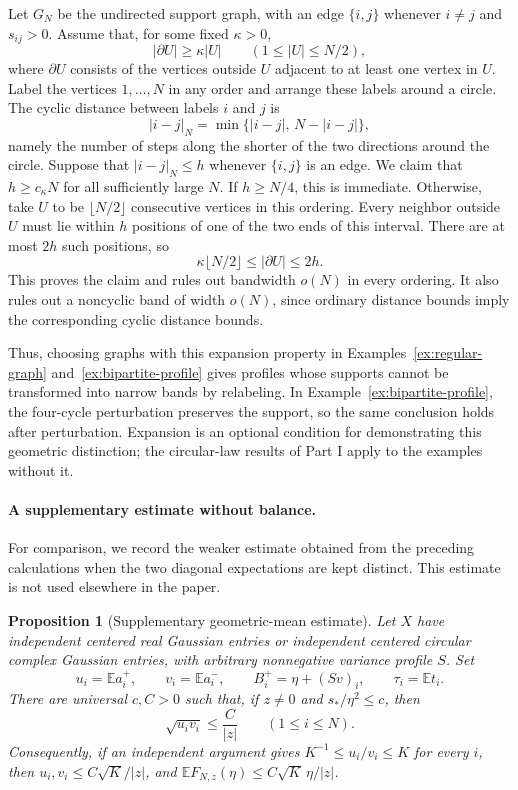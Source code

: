 \documentclass[11pt,reqno]{amsart}
\numberwithin{equation}{section}
\theoremstyle{plain}
\newtheorem{proposition}[theorem]{Proposition}
\theoremstyle{definition}
\theoremstyle{remark}
\begin{document}
Let $G_N$ be the undirected support graph, with an edge $\{i,j\}$ whenever
$i\ne j$ and $s_{ij}>0$. Assume that, for some fixed $\kappa>0$,
\[
 |\partial U|\ge\kappa|U|\qquad(1\le |U|\le N/2),
\]
where $\partial U$ consists of the vertices outside $U$ adjacent to at
least one vertex in $U$. Label the vertices $1,\ldots,N$ in any order and arrange these labels
around a circle. The cyclic distance between labels $i$ and $j$ is
\[
 |i-j|_N=\min\{|i-j|,\,N-|i-j|\},
\]
namely the number of steps along the shorter of the two directions
around the circle. Suppose that $|i-j|_N\le h$ whenever $\{i,j\}$
is an edge.
We claim that $h\ge c_\kappa N$ for all sufficiently large $N$.
If $h\ge N/4$, this is immediate. Otherwise, take $U$ to be
$\lfloor N/2\rfloor$ consecutive vertices in this ordering. Every
neighbor outside $U$ must lie within $h$ positions of one of the two
ends of this interval. There are at most $2h$ such positions, so
\[
 \kappa\lfloor N/2\rfloor\le |\partial U|\le2h.
\]
This proves the claim and rules out bandwidth $o(N)$ in every ordering.
It also rules out a noncyclic band of width $o(N)$, since ordinary
distance bounds imply the corresponding cyclic distance bounds.

Thus, choosing graphs with this expansion property in
Examples~\ref{ex:regular-graph} and~\ref{ex:bipartite-profile} gives
profiles whose supports cannot be transformed into narrow bands by
relabeling. In Example~\ref{ex:bipartite-profile}, the four-cycle
perturbation preserves the support, so the same conclusion holds after
perturbation. Expansion is an optional condition for demonstrating this
geometric distinction; the circular-law results of Part I apply to the
examples without it.

\paragraph{A supplementary estimate without balance.}
For comparison, we record the weaker estimate obtained from the preceding
calculations when the two diagonal expectations are kept distinct.
This estimate is not used elsewhere in the paper.

\begin{proposition}[Supplementary geometric-mean estimate]
\label{prop:nonsymmetric-geometric}
Let $X$ have independent centered real Gaussian entries or independent
centered circular complex Gaussian entries, with arbitrary nonnegative
variance profile $S$.  Set
\[
 u_i=\mathbb E a_i^+,\qquad v_i=\mathbb E a_i^-,\qquad
 B_i^+=\eta+(Sv)_i,\qquad \tau_i=\mathbb E t_i.
\]
There are universal $c,C>0$ such that, if $z\ne0$ and
$s_*/\eta^2\leq c$, then
\begin{equation}\label{eq:nonsymmetric-geometric}
 \sqrt{u_iv_i}\leq\frac C{|z|}\qquad(1\leq i\leq N).
\end{equation}
Consequently, if an independent argument gives
$K^{-1}\leq u_i/v_i\leq K$ for every $i$, then
$u_i,v_i\leq C\sqrt K/|z|$, and
$\mathbb EF_{N,z}(\eta)\leq C\sqrt K\,\eta/|z|$.
\end{proposition}
\end{document}
